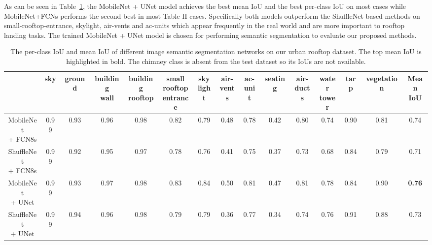  As can be seen in Table~\ref{tab:segmentation_results}, the
MobileNet + UNet model achieves the best mean IoU and the
best per-class IoU on most cases while MobileNet+FCNs
performs the second best in most Table II cases. Specifically
both models outperform the ShuffleNet based methods on
small-rooftop-entrance, skylight, air-vents and ac-units which
appear frequently in the real world and are more important
to rooftop landing tasks. The trained MobileNet + UNet model is chosen for performing semantic segmentation to evaluate our proposed methods.
\begin{table}[htbp]
    \centering
    \caption[Semantic segmentation accuracy results]{The per-class IoU and mean IoU of different image semantic segmentation networks on our urban rooftop dataset. The top mean IoU is highlighted in bold. The chimney class is absent from the test dataset so its IoUs are not available.}
    \resizebox{1.0 \textwidth}{!} {
    \begin{tabular}{c|ccccccccccccc|c}
        \toprule
         & sky & ground & \makecell{building \\wall} &  \makecell{building \\rooftop} &  \makecell{small \\rooftop \\entrance} &  \makecell{sky\\light} &  \makecell{air-\\vents} &  \makecell{ac-\\unit} & seating &  \makecell{air-\\ducts} &  \makecell{water\\tower} & tarp & vegetation & \makecell{Mean\\ IoU}\\
         \midrule
         \makecell{MobileNet\\+ FCN8s} & 0.99 & 0.93 & 0.96 & 0.98 & 0.82 & 0.79 & 0.48 & 0.78 & 0.42 & 0.80 & 0.74 & 0.90 & 0.81 & 0.74 \\
         \makecell{ShuffleNet \\+ FCN8s} & 0.99 & 0.92 & 0.95 & 0.97 & 0.78 & 0.76 & 0.41 & 0.75 & 0.37 & 0.73 & 0.68 & 0.84 & 0.79 & 0.71\\
         \makecell{MobileNet \\+ UNet} & 0.99 & 0.93 & 0.97 & 0.98 & 0.83 & 0.84 & 0.50 & 0.81 & 0.47 & 0.81 & 0.78 & 0.84 & 0.90 & \textbf{0.76}\\
         \makecell{ShuffleNet \\+ UNet} & 0.99 & 0.94 & 0.96 & 0.98 & 0.79 & 0.79 & 0.36 & 0.77 & 0.34 & 0.74 & 0.76 & 0.91 & 0.88 & 0.73\\
        \bottomrule
    \end{tabular}
    }
    \label{tab:segmentation_results}
\end{table}

